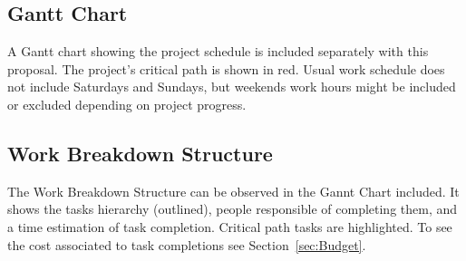
\subsection{Gantt Chart}

A Gantt chart showing the project schedule is included separately with this
proposal. The project's critical path is shown in red. Usual work schedule does
not include Saturdays and Sundays, but weekends work hours might be included or excluded depending on project
progress.

\subsection{Work Breakdown Structure}

The Work Breakdown Structure can be observed in the Gannt Chart included. It
shows the tasks hierarchy (outlined), people responsible of completing them, and
a time estimation of task completion. Critical path tasks are highlighted. To
see the cost associated to task completions see Section~\ref{sec:Budget}.
